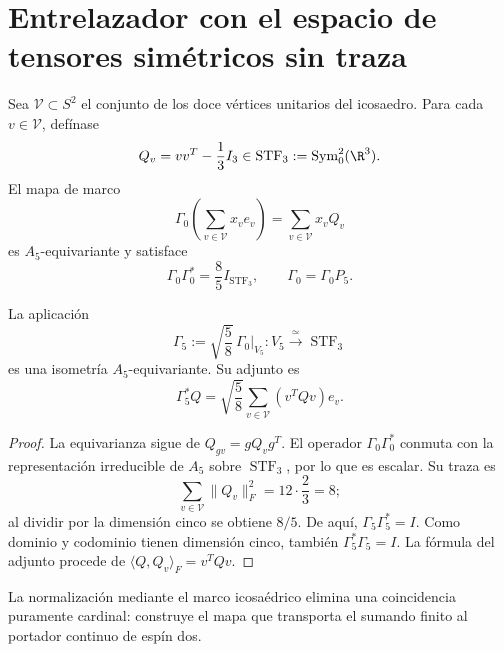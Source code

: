 \section{Entrelazador con el espacio de tensores sim\'etricos sin traza}

Sea \(\mathcal V\subset S^2\) el conjunto de los doce v\'ertices unitarios
del icosaedro. Para cada \(v\in\mathcal V\), def\'inase
\begin{equation}
\label{rm:eq:gravity-Qv}
Q_v=vv^T-\frac13I_3\in
\operatorname{STF}_3:=\operatorname{Sym}^2_0(\R^3).
\end{equation}
El mapa de marco
\begin{equation}
\label{rm:eq:gravity-Gamma0}
\Gamma_0\!\left(\sum_{v\in\mathcal V}x_ve_v\right)
=\sum_{v\in\mathcal V}x_vQ_v
\end{equation}
es \(A_5\)-equivariante y satisface
\begin{equation}
\label{rm:eq:gravity-tight-frame}
\Gamma_0\Gamma_0^*=\frac85I_{\operatorname{STF}_3},
\qquad
\Gamma_0=\Gamma_0P_5.
\end{equation}

\begin{theorem}
\label{rm:thm:gravity-gamma5}
La aplicaci\'on
\begin{equation}
\label{rm:eq:gravity-gamma5}
\boxed{
\Gamma_5:=\sqrt{\frac58}\,\Gamma_0|_{V_5}:
V_5\xrightarrow{\ \simeq\ }\operatorname{STF}_3}
\end{equation}
es una isometr\'ia \(A_5\)-equivariante. Su adjunto es
\begin{equation}
\label{rm:eq:gravity-gamma5-adjoint}
\Gamma_5^*Q=\sqrt{\frac58}
\sum_{v\in\mathcal V}(v^TQv)e_v.
\end{equation}
\end{theorem}

\begin{proof}
La equivarianza sigue de \(Q_{gv}=gQ_vg^T\). El operador
\(\Gamma_0\Gamma_0^*\) conmuta con la representaci\'on irreducible de
\(A_5\) sobre \(\operatorname{STF}_3\), por lo que es escalar. Su traza
es
\[
\sum_{v\in\mathcal V}\|Q_v\|_F^2
=12\cdot\frac23=8;
\]
al dividir por la dimensi\'on cinco se obtiene \(8/5\). De aqu\'i,
\(\Gamma_5\Gamma_5^*=I\). Como dominio y codominio tienen dimensi\'on
cinco, tambi\'en \(\Gamma_5^*\Gamma_5=I\). La f\'ormula del adjunto
procede de \(\langle Q,Q_v\rangle_F=v^TQv\).
\end{proof}

La normalizaci\'on mediante el marco icosa\'edrico elimina una coincidencia
puramente cardinal: construye el mapa que transporta el sumando finito al
portador continuo de esp\'in dos.

